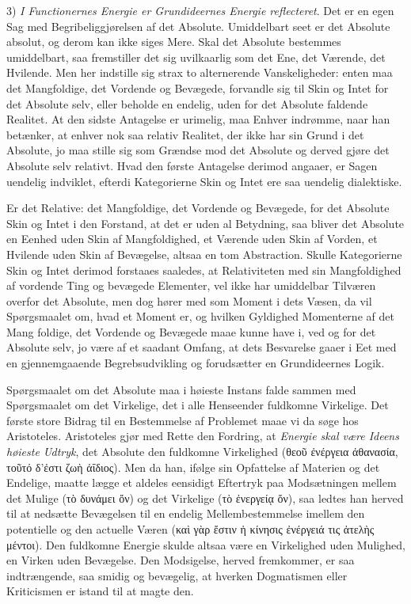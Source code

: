 \documentclass[12pt]{book}
\newcommand{\apage}[1]{\marginnote{\footnotesize\textit{[#1]}}}
\begin{document}
3) \emph{I Functionernes Energie er Grundideernes Energie reflecteret}. Det er en egen Sag med
Begribeliggjørelsen af det Absolute. Umiddelbart seet er det Absolute absolut, og derom kan ikke siges
Mere. Skal det Absolute bestemmes umiddelbart, saa fremstiller det sig uvilkaarlig som det Ene, det
Værende, det Hvilende. Men her indstille sig strax to alternerende Vanskeligheder: enten maa det
Mangfoldige, det Vordende og Bevægede, forvandle sig til Skin og Intet for det Absolute selv, eller
beholde en endelig, uden for det Absolute faldende Realitet. At den sidste Antagelse er urimelig, maa
Enhver indrømme, naar han betænker, at enhver nok saa relativ Realitet, der ikke har sin Grund i det
Absolute, jo maa stille sig som Grændse mod det Absolute og derved gjøre det Absolute selv relativt.
Hvad den første Antagelse derimod angaaer, er Sagen uendelig indviklet, efterdi Kategorierne Skin og
Intet ere saa uendelig dialektiske.

Er det Relative: det Mangfoldige, det Vordende og Bevægede, for det Absolute Skin og Intet i den
Forstand, at det er uden al Betydning, saa bliver det Absolute en Eenhed uden Skin af Mangfoldighed,
et Værende uden Skin af Vorden, et Hvilende uden Skin af Bevægelse, altsaa en tom Abstraction. Skulle
Kategorierne Skin og Intet derimod forstaaes saaledes, at Relativiteten med sin Mangfoldighed af
vordende Ting og bevægede Elementer, vel ikke har umiddelbar Tilværen overfor det Absolute, men dog
hører med som Moment i dets Væsen, da vil Spørgsmaalet om, hvad et Moment er, og hvilken Gyldighed
Momenterne af det Mang\-%
 \apage{447}foldige, det Vordende og Bevægede maae kunne have i, ved og for det Absolute selv, jo være af et
saadant Omfang, at dets Besvarelse gaaer i Eet med en gjennemgaaende Begrebsudvikling og forudsætter
en Grundideernes Logik.

Spørgsmaalet om det Absolute maa i høieste Instans falde sammen med Spørgsmaalet om det Virkelige, det
i alle Henseender fuldkomne Virkelige. Det første store Bidrag til en Bestemmelse af Problemet maae vi
da søge hos Aristoteles. Aristoteles gjør med Rette den Fordring, at \emph{Energie skal være Ideens
høieste Udtryk}, det Absolute den fuldkomne Virkelighed (θεοῦ ἐνέργεια ἀθανασία, τοῦτό δ'ἐστι ζωὴ
ἀΐδιος). Men da han, ifølge sin Opfattelse af Materien og det Endelige, maatte lægge et aldeles
eensidigt Eftertryk paa Modsætningen mellem det Mulige (τὸ δυνάμει ὄν) og det Virkelige (τὸ ἐνεργείᾳ
ὄν), saa ledtes han herved til at nedsætte Bevægelsen til en endelig Mellembestemmelse imellem den
potentielle og den actuelle Væren (καὶ γὰρ ἔστιν ἡ κίνησις ἐνέργειά τις ἀτελὴς μέντοι). Den fuldkomne
Energie skulde altsaa være en Virkelighed uden Mulighed, en Virken uden Bevægelse. %
Den Modsigelse, herved fremkommer, er saa indtrængende, saa smidig og bevægelig, at hverken
Dogmatismen eller Kriticismen er istand til at magte den.
\end{document}
